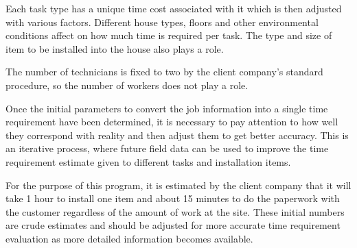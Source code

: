 Each task type has a unique time cost associated with it which is then adjusted with various factors. Different house types, floors and other environmental conditions affect on how much time is required per task. The type and size of item to be installed into the house also plays a role. 

The number of technicians is fixed to two by the client company's standard procedure, so the number of workers does not play a role.  

Once the initial parameters to convert the job information into a single time requirement have been determined, it is necessary to pay attention to how well they correspond with reality and then adjust them to get better accuracy. This is an iterative process, where future field data can be used to improve the time requirement estimate given to different tasks and installation items.

For the purpose of this program, it is estimated by the client company that it will take 1 hour to install one item and about 15 minutes to do the paperwork with the customer regardless of the amount of work at the site. These initial numbers are crude estimates and should be adjusted for more accurate time requirement evaluation as more detailed information becomes available.
    




